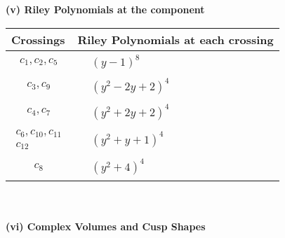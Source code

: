 \documentclass[1p]{elsarticle_modified}
\theoremstyle{definition}
\begin{document}
\newpage\renewcommand{\arraystretch}{1}
\flushleft \textbf{(v) Riley Polynomials at the component}\newline \\
\begin{tabular}{m{50pt}|m{274pt}}
Crossings & \hspace{64pt}Riley Polynomials at each crossing \\
\hline $$\begin{aligned}c_{1},c_{2},c_{5}\end{aligned}$$&$\begin{aligned}
&(y-1)^8
\end{aligned}$\\
\hline $$\begin{aligned}c_{3},c_{9}\end{aligned}$$&$\begin{aligned}
&(y^2-2 y+2)^4
\end{aligned}$\\
\hline $$\begin{aligned}c_{4},c_{7}\end{aligned}$$&$\begin{aligned}
&(y^2+2 y+2)^4
\end{aligned}$\\
\hline $$\begin{aligned}c_{6},c_{10},c_{11}\\c_{12}\end{aligned}$$&$\begin{aligned}
&(y^2+y+1)^4
\end{aligned}$\\
\hline $$\begin{aligned}c_{8}\end{aligned}$$&$\begin{aligned}
&(y^2+4)^4
\end{aligned}$\\
\hline
\end{tabular}\\~\\
\newpage\flushleft \textbf{(vi) Complex Volumes and Cusp Shapes}
\end{document}
